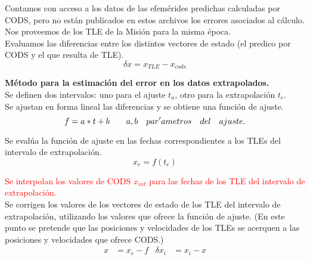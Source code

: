 Contamos con acceso a los datos de las efem\'erides predichas calculadas por CODS, pero no están publicados en estos archivos los errores asociados al c\'alculo.\\
Nos proveemos de los TLE de la Misi\'on para la misma \'epoca.\\
Evaluamos las diferencias entre los distintos vectores de estado (el predico por CODS y el que resulta de TLE).\\

\begin{equation}
 \delta x = x_{TLE}-x_{cods}
\end{equation}


{\bf{M\'etodo para la estimaci\'on del error en los datos extrapolados.}}\\
Se definen dos intervalos: uno para el ajuste $t_{a}$, otro para la extrapolaci\'on $t_{e}$.\\
Se ajustan en forma lineal las diferencias y se obtiene una funci\'on de ajuste.\\
\begin{equation}
 f=a*t+b \qquad a,b\quad par\\'ametros\quad del \quad ajuste.
\end{equation}

Se eval\'ua la funci\'on de ajuste en las fechas correspondientes a los TLEs del intervalo de extrapolaci\'on.\\
\begin{equation}
 x_{e}=f(t_{e})
\end{equation}

{\textcolor{red}{Se interpolan los valores de CODS $x_{int}$ para las fechas de los TLE del intervalo de extrapolaci\'on.}}\\
Se corrigen los valores de los vectores de estado de los TLE del intervalo de extrapolaci\'on, utilizando los valores que ofrece la funci\'on de ajuste. (En este punto se pretende que las posiciones y velocidades de los TLEs se acerquen a las posiciones y velocidades que ofrece CODS.)\\
\begin{align}
 x&=x_{e}-f & \delta x_{i}& = x_{i} - x 
\end{align}


